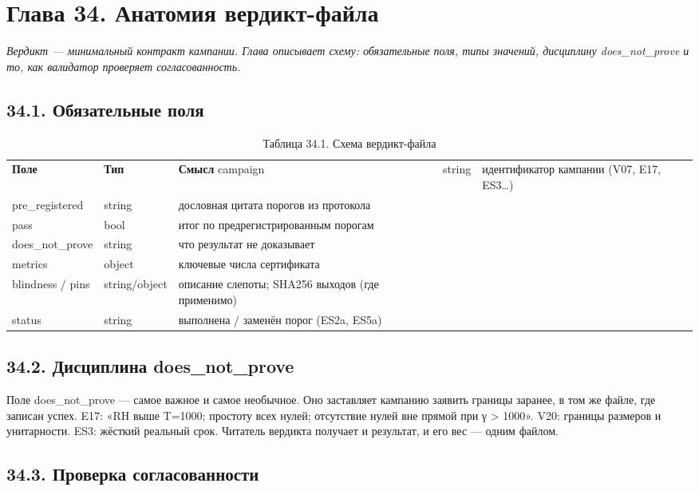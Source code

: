 \documentclass[11pt,a4paper]{article}
\begin{document}
\section{Глава 34. Анатомия вердикт-файла}

\noindent\textit{\color{copper}Вердикт — минимальный контракт кампании. Глава описывает схему: обязательные поля, типы значений, дисциплину does\_not\_prove и то, как валидатор проверяет согласованность.}

\subsection{34.1. Обязательные поля}

\begin{table}[htbp]\centering\small
\caption{Таблица 34.1. Схема вердикт-файла}
\begin{tabular}{p{} p{} p{}}
\toprule
\textbf{Поле} & \textbf{Тип} & \textbf{Смысл}
\midrule
campaign & string & идентификатор кампании (V07, E17, ES3…) \\
pre\_registered & string & дословная цитата порогов из протокола \\
pass & bool & итог по предрегистрированным порогам \\
does\_not\_prove & string & что результат не доказывает \\
metrics & object & ключевые числа сертификата \\
blindness / pins & string/object & описание слепоты; SHA256 выходов (где применимо) \\
status & string & выполнена / заменён порог (ES2a, ES5a) \\
\bottomrule
\end{tabular}
\end{table}

\subsection{34.2. Дисциплина does\_not\_prove}

Поле does\_not\_prove — самое важное и самое необычное. Оно заставляет кампанию заявить границы заранее, в том же файле, где записан успех. E17: «RH выше T=1000; простоту всех нулей; отсутствие нулей вне прямой при γ > 1000». V20: границы размеров и унитарности. ES3: жёсткий реальный срок. Читатель вердикта получает и результат, и его вес — одним файлом.

\subsection{34.3. Проверка согласованности}
\end{document}
